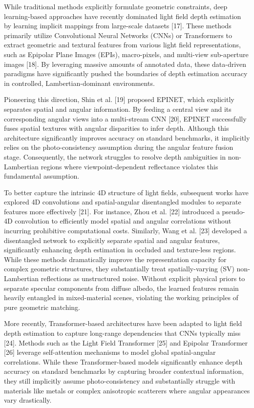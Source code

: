 While traditional methods explicitly formulate geometric constraints, deep learning-based approaches have recently dominated light field depth estimation by learning implicit mappings from large-scale datasets [17]. These methods primarily utilize Convolutional Neural Networks (CNNs) or Transformers to extract geometric and textural features from various light field representations, such as Epipolar Plane Images (EPIs), macro-pixels, and multi-view sub-aperture images [18]. By leveraging massive amounts of annotated data, these data-driven paradigms have significantly pushed the boundaries of depth estimation accuracy in controlled, Lambertian-dominant environments.

Pioneering this direction, Shin et al. [19] proposed EPINET, which explicitly separates spatial and angular information. By feeding a central view and its corresponding angular views into a multi-stream CNN [20], EPINET successfully fuses spatial textures with angular disparities to infer depth. Although this architecture significantly improves accuracy on standard benchmarks, it implicitly relies on the photo-consistency assumption during the angular feature fusion stage. Consequently, the network struggles to resolve depth ambiguities in non-Lambertian regions where viewpoint-dependent reflectance violates this fundamental assumption.

To better capture the intrinsic 4D structure of light fields, subsequent works have explored 4D convolutions and spatial-angular disentangled modules to separate features more effectively [21]. For instance, Zhou et al. [22] introduced a pseudo-4D convolution to efficiently model spatial and angular correlations without incurring prohibitive computational costs. Similarly, Wang et al. [23] developed a disentangled network to explicitly separate spatial and angular features, significantly enhancing depth estimation in occluded and texture-less regions. While these methods dramatically improve the representation capacity for complex geometric structures, they substantially treat spatially-varying (SV) non-Lambertian reflections as unstructured noise. Without explicit physical priors to separate specular components from diffuse albedo, the learned features remain heavily entangled in mixed-material scenes, violating the working principles of pure geometric matching.

More recently, Transformer-based architectures have been adapted to light field depth estimation to capture long-range dependencies that CNNs typically miss [24]. Methods such as the Light Field Transformer [25] and Epipolar Transformer [26] leverage self-attention mechanisms to model global spatial-angular correlations. While these Transformer-based models significantly enhance depth accuracy on standard benchmarks by capturing broader contextual information, they still implicitly assume photo-consistency and substantially struggle with materials like metals or complex anisotropic scatterers where angular appearances vary drastically.

